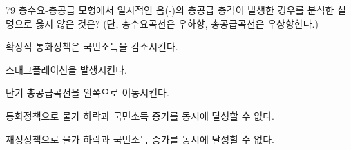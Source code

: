 \begin{question}{79}
총수요-총공급 모형에서 일시적인 음(-)의 총공급 충격이 발생한 경우를 분석한 설명으로 옳지 않은 것은? (단, 총수요곡선은 우하향, 총공급곡선은 우상향한다.)
\begin{choices}
  \item 확장적 통화정책은 국민소득을 감소시킨다.
  \item 스태그플레이션을 발생시킨다.
  \item 단기 총공급곡선을 왼쪽으로 이동시킨다.
  \item 통화정책으로 물가 하락과 국민소득 증가를 동시에 달성할 수 없다.
  \item 재정정책으로 물가 하락과 국민소득 증가를 동시에 달성할 수 없다.
\end{choices}
\end{question}
